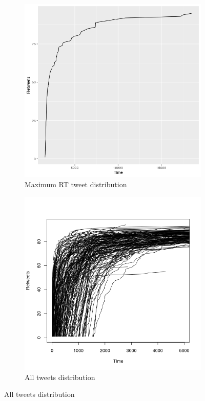 \begin{figure}[H]
	\centering
	\begin{subfigure}{.4\textwidth}
	  \centering
	  \includegraphics[width=.8\linewidth]{./Figures/maxRTcurve.png}
	  \caption{Maximum RT tweet distribution}
	  \label{fig:sub1}
	\end{subfigure}%
	\begin{subfigure}{.4\textwidth}
	  \centering
	  \includegraphics[width=1.05\linewidth]{./Figures/all_tweets.png}
	  \caption{All tweets distribution}
	  \label{fig:sub2}
	\end{subfigure}
\end{figure}

